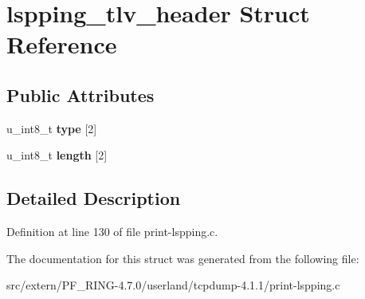 \hypertarget{structlspping__tlv__header}{
\section{lspping\_\-tlv\_\-header Struct Reference}
\label{structlspping__tlv__header}
}
\subsection*{Public Attributes}
\begin{DoxyCompactItemize}
\item 
\hypertarget{structlspping__tlv__header_a229fda972c08167b0446d2be19f421a8}{
u\_\-int8\_\-t {\bfseries type} \mbox{[}2\mbox{]}}
\label{structlspping__tlv__header_a229fda972c08167b0446d2be19f421a8}

\item 
\hypertarget{structlspping__tlv__header_a60b9b566c505883c42d2fd346c4f3043}{
u\_\-int8\_\-t {\bfseries length} \mbox{[}2\mbox{]}}
\label{structlspping__tlv__header_a60b9b566c505883c42d2fd346c4f3043}

\end{DoxyCompactItemize}


\subsection{Detailed Description}


Definition at line 130 of file print-\/lspping.c.



The documentation for this struct was generated from the following file:\begin{DoxyCompactItemize}
\item 
src/extern/PF\_\-RING-\/4.7.0/userland/tcpdump-\/4.1.1/print-\/lspping.c\end{DoxyCompactItemize}
